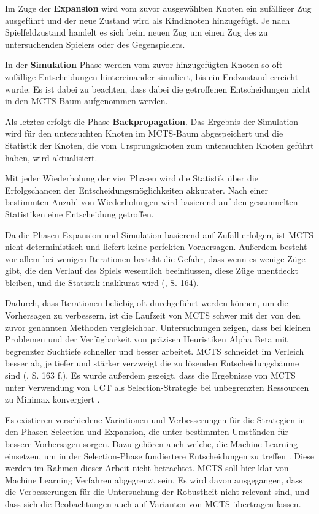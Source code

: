 Im Zuge der \textbf{Expansion} wird vom zuvor ausgewählten Knoten ein zufälliger Zug ausgeführt und der neue Zustand wird als Kindknoten hinzugefügt. Je nach Spielfeldzustand handelt es sich beim neuen Zug um einen Zug des zu untersuchenden Spielers oder des Gegenspielers.

In der \textbf{Simulation}-Phase werden vom zuvor hinzugefügten Knoten so oft zufällige Entscheidungen hintereinander simuliert, bis ein Endzustand erreicht wurde. Es ist dabei zu beachten, dass dabei die getroffenen Entscheidungen nicht in den MCTS-Baum aufgenommen werden.

Als letztes erfolgt die Phase \textbf{Backpropagation}. Das Ergebnis der Simulation wird für den untersuchten Knoten im MCTS-Baum abgespeichert und die Statistik der Knoten, die vom Ursprungsknoten zum untersuchten Knoten geführt haben, wird aktualisiert.

Mit jeder Wiederholung der vier Phasen wird die Statistik über die Erfolgschancen der Entscheidungsmöglichkeiten akkurater. Nach einer bestimmten Anzahl von Wiederholungen wird basierend auf den gesammelten Statistiken eine Entscheidung getroffen.

Da die Phasen Expansion und Simulation basierend auf Zufall erfolgen, ist MCTS nicht deterministisch und liefert keine perfekten Vorhersagen. Außerdem besteht vor allem bei wenigen Iterationen besteht die Gefahr, dass wenn es wenige Züge gibt, die den Verlauf des Spiels wesentlich beeinflussen, diese Züge unentdeckt bleiben, und die Statistik inakkurat wird (\cite{Russell.2020}, S. 164).

Dadurch, dass Iterationen beliebig oft durchgeführt werden können, um die Vorhersagen zu verbessern, ist die Laufzeit von MCTS schwer mit der von den zuvor genannten Methoden vergleichbar. Untersuchungen zeigen, dass bei kleinen Problemen und der Verfügbarkeit von präzisen Heuristiken Alpha Beta mit begrenzter Suchtiefe schneller und besser arbeitet. MCTS schneidet im Verleich besser ab, je tiefer und stärker verzweigt die zu lösenden Entscheidungsbäume sind (\cite{Russell.2020}, S. 163 f.). Es wurde außerdem gezeigt, dass die Ergebnisse von MCTS unter Verwendung von UCT als Selection-Strategie bei unbegrenzten Ressourcen zu Minimax konvergiert \cite{Browne.2012}.

Es existieren verschiedene Variationen und Verbesserungen für die Strategien in den Phasen Selection und Expansion, die unter bestimmten Umständen für bessere Vorhersagen sorgen. Dazu gehören auch welche, die Machine Learning einsetzen, um in der Selection-Phase fundiertere Entscheidungen zu treffen \cite{Browne.2012}. Diese werden im Rahmen dieser Arbeit nicht betrachtet. MCTS soll hier klar von Machine Learning Verfahren abgegrenzt sein. Es wird davon ausgegangen, dass die Verbesserungen für die Untersuchung der Robustheit nicht relevant sind, und dass sich die Beobachtungen auch auf Varianten von MCTS übertragen lassen.

